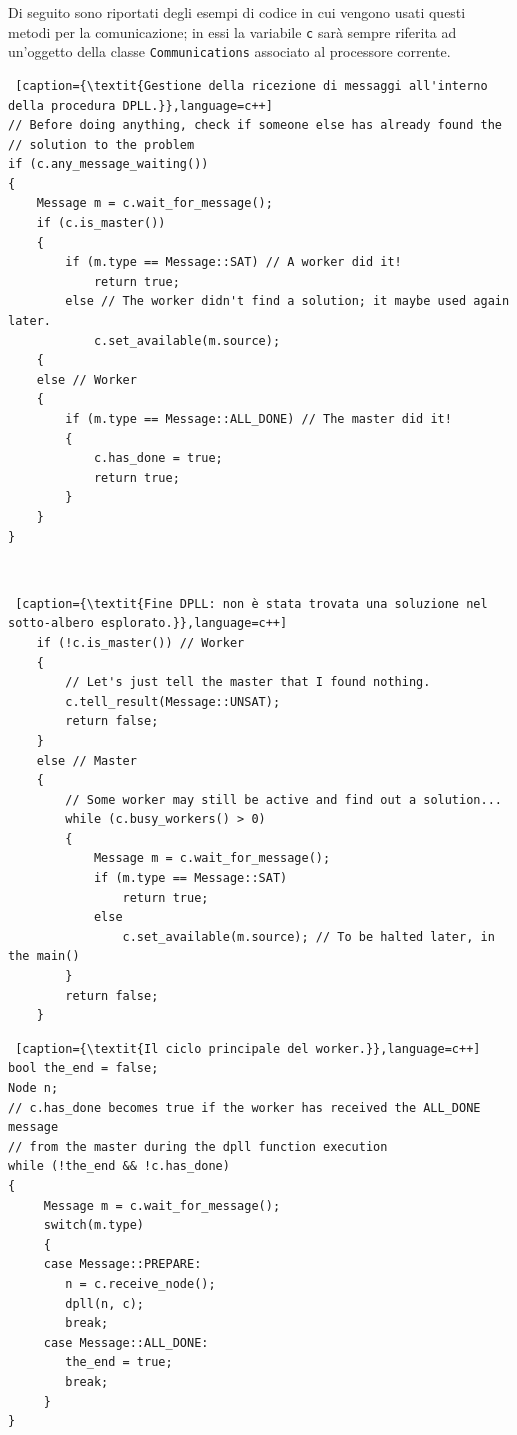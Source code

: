 \documentclass[12pt, a4paper, twosides]{report}
\begin{document}
Di seguito sono riportati degli esempi di codice in cui vengono usati questi metodi per la comunicazione; in essi la variabile \verb|c| sarà sempre riferita ad un'oggetto della classe \verb|Communications| associato al processore corrente.

\vspace*{10pt}
\begin{lstlisting} [caption={\textit{Gestione della ricezione di messaggi all'interno della procedura DPLL.}},language=c++]
// Before doing anything, check if someone else has already found the
// solution to the problem
if (c.any_message_waiting())
{
    Message m = c.wait_for_message();
    if (c.is_master())
    {
        if (m.type == Message::SAT) // A worker did it!
            return true;
        else // The worker didn't find a solution; it maybe used again later.
            c.set_available(m.source);
    {
    else // Worker
    {
        if (m.type == Message::ALL_DONE) // The master did it!
        {
            c.has_done = true;
            return true;
        }
    }
}
\end{lstlisting}

\begin{minipage}[t]{1\textwidth}\mbox{}\\[-\baselineskip]
\begin{lstlisting} [caption={\textit{Fine DPLL: non è stata trovata una soluzione nel sotto-albero esplorato.}},language=c++]
    if (!c.is_master()) // Worker
    {
        // Let's just tell the master that I found nothing.
        c.tell_result(Message::UNSAT);
        return false;
    }
    else // Master
    {
        // Some worker may still be active and find out a solution...
        while (c.busy_workers() > 0)
        {
            Message m = c.wait_for_message();
            if (m.type == Message::SAT)
                return true;
            else
                c.set_available(m.source); // To be halted later, in the main()
        }
        return false;
    }
\end{lstlisting}
\end{minipage}

\vspace*{10pt}
\begin{lstlisting} [caption={\textit{Il ciclo principale del worker.}},language=c++]
bool the_end = false;
Node n;
// c.has_done becomes true if the worker has received the ALL_DONE message
// from the master during the dpll function execution
while (!the_end && !c.has_done)
{
     Message m = c.wait_for_message();
     switch(m.type)
     {
     case Message::PREPARE:
        n = c.receive_node();
        dpll(n, c);
        break;
     case Message::ALL_DONE:
        the_end = true;
        break;
     }
}
\end{lstlisting}
\end{document}
